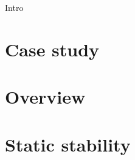 Intro

\section*{Case study}
\label{sec:intro:case_study}%

\section*{Overview}
\label{sec:intro:overview}%

\section*{Static stability}
\label{sec:intro:support}